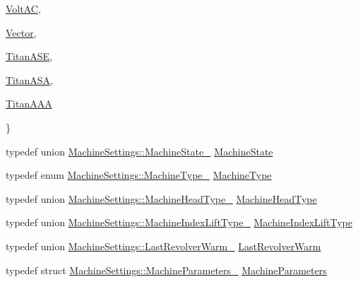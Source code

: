 \begin{DoxyCompactItemize}
\begin{DoxyCompactItemize}
\item\mbox{\hyperlink{classMachineSettings_a0feee7a1964811bb4a602e9cc3bf459facb1903efc2ca403d2b8bafad23ac475a}{Volt\+AC}}, 
\item\mbox{\hyperlink{classMachineSettings_a0feee7a1964811bb4a602e9cc3bf459fabbded889bc90d83b77be39316591c3e7}{Vector}}, 
\item\mbox{\hyperlink{classMachineSettings_a0feee7a1964811bb4a602e9cc3bf459faabaa3c9e55c4ed04fbf1f544bbaf2ee3}{Titan\+A\+SE}}, 
\item\mbox{\hyperlink{classMachineSettings_a0feee7a1964811bb4a602e9cc3bf459fadc58b3fd25459977198f34e19e63c49a}{Titan\+A\+SA}}, 
\item\mbox{\hyperlink{classMachineSettings_a0feee7a1964811bb4a602e9cc3bf459faddbd23233dca7bda197b435fedff8344}{Titan\+A\+AA}}
\end{DoxyCompactItemize}
 \}
\item 
typedef union \mbox{\hyperlink{unionMachineSettings_1_1MachineState__}{Machine\+Settings\+::\+Machine\+State\+\_\+}} \mbox{\hyperlink{classMachineSettings_a3d02f0565ba9c53dbb59d5d086208cad}{Machine\+State}}
\item 
typedef enum \mbox{\hyperlink{classMachineSettings_a0feee7a1964811bb4a602e9cc3bf459f}{Machine\+Settings\+::\+Machine\+Type\+\_\+}} \mbox{\hyperlink{classMachineSettings_af95330ff3a80de06fe956f5297ec0fc5}{Machine\+Type}}
\item 
typedef union \mbox{\hyperlink{unionMachineSettings_1_1MachineHeadType__}{Machine\+Settings\+::\+Machine\+Head\+Type\+\_\+}} \mbox{\hyperlink{classMachineSettings_ab7b6a5e7f8a67169e7c28067e7d4bbe9}{Machine\+Head\+Type}}
\item 
typedef union \mbox{\hyperlink{unionMachineSettings_1_1MachineIndexLiftType__}{Machine\+Settings\+::\+Machine\+Index\+Lift\+Type\+\_\+}} \mbox{\hyperlink{classMachineSettings_a0a3b23271b2f401ab585236bd8330a82}{Machine\+Index\+Lift\+Type}}
\item 
typedef union \mbox{\hyperlink{unionMachineSettings_1_1LastRevolverWarm__}{Machine\+Settings\+::\+Last\+Revolver\+Warm\+\_\+}} \mbox{\hyperlink{classMachineSettings_ad31cf583a3d6462e47d920209239ffe6}{Last\+Revolver\+Warm}}
\item 
typedef struct \mbox{\hyperlink{structMachineSettings_1_1MachineParameters__}{Machine\+Settings\+::\+Machine\+Parameters\+\_\+}} \mbox{\hyperlink{classMachineSettings_a87879e13793dbc7c10d4fa18e1236751}{Machine\+Parameters}}
\end{DoxyCompactItemize}
